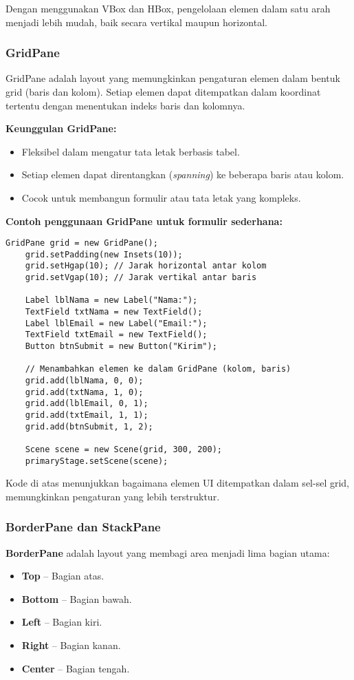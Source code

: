 Dengan menggunakan VBox dan HBox, pengelolaan elemen dalam satu arah menjadi lebih mudah, baik secara vertikal maupun horizontal.

\subsubsection{GridPane}

GridPane adalah layout yang memungkinkan pengaturan elemen dalam bentuk grid (baris dan kolom). Setiap elemen dapat ditempatkan dalam koordinat tertentu dengan menentukan indeks baris dan kolomnya.

\textbf{Keunggulan GridPane:}
\begin{itemize}
	\item Fleksibel dalam mengatur tata letak berbasis tabel.
	\item Setiap elemen dapat direntangkan (\textit{spanning}) ke beberapa baris atau kolom.
	\item Cocok untuk membangun formulir atau tata letak yang kompleks.
\end{itemize}

\textbf{Contoh penggunaan GridPane untuk formulir sederhana:}
\begin{lstlisting}[style=JavaStyle, caption=Membuat formulir menggunakan GridPane]
	GridPane grid = new GridPane();
	grid.setPadding(new Insets(10));
	grid.setHgap(10); // Jarak horizontal antar kolom
	grid.setVgap(10); // Jarak vertikal antar baris
	
	Label lblNama = new Label("Nama:");
	TextField txtNama = new TextField();
	Label lblEmail = new Label("Email:");
	TextField txtEmail = new TextField();
	Button btnSubmit = new Button("Kirim");
	
	// Menambahkan elemen ke dalam GridPane (kolom, baris)
	grid.add(lblNama, 0, 0);
	grid.add(txtNama, 1, 0);
	grid.add(lblEmail, 0, 1);
	grid.add(txtEmail, 1, 1);
	grid.add(btnSubmit, 1, 2);
	
	Scene scene = new Scene(grid, 300, 200);
	primaryStage.setScene(scene);
\end{lstlisting}

Kode di atas menunjukkan bagaimana elemen UI ditempatkan dalam sel-sel grid, memungkinkan pengaturan yang lebih terstruktur.

\subsubsection{BorderPane dan StackPane}

\textbf{BorderPane} adalah layout yang membagi area menjadi lima bagian utama:
\begin{itemize}
	\item \textbf{Top} – Bagian atas.
	\item \textbf{Bottom} – Bagian bawah.
	\item \textbf{Left} – Bagian kiri.
	\item \textbf{Right} – Bagian kanan.
	\item \textbf{Center} – Bagian tengah.
\end{itemize}

